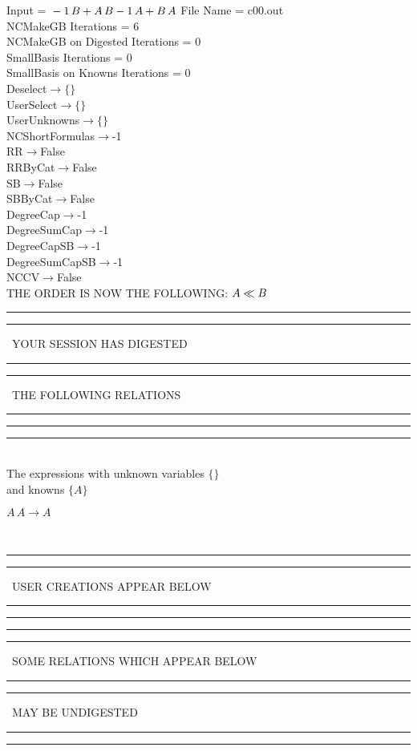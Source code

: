 \documentclass[rep10,leqno]{report}
\begin{document}
\normalsize
\baselineskip=12pt
\noindent
Input = 
$
\\-1\,
 B + A\,
 B\\
-1\,
 A + B\,
 A\\
$
File Name = c00.out\\
NCMakeGB Iterations = 6\\
NCMakeGB on Digested Iterations = 0\\
SmallBasis Iterations = 0\\
SmallBasis on Knowns Iterations = 0\\
Deselect$\rightarrow \{\}$\\
UserSelect$\rightarrow \{\}$\\
UserUnknowns$\rightarrow \{\}$\\
NCShortFormulas$\rightarrow$-1\\
RR$\rightarrow $False\\
RRByCat$\rightarrow $False\\
SB$\rightarrow $False\\
SBByCat$\rightarrow $False\\
DegreeCap$\rightarrow $-1\\
DegreeSumCap$\rightarrow $-1\\
DegreeCapSB$\rightarrow $-1\\
DegreeSumCapSB$\rightarrow $-1\\
NCCV$\rightarrow $False\\
THE ORDER IS NOW THE FOLLOWING:\hfil\break
$
A\ll
B\\
$
\rule[2pt]{6in}{4pt}\hfil\break
\rule[2pt]{1.879in}{4pt}
\ YOUR SESSION HAS DIGESTED\ 
\rule[2pt]{1.879in}{4pt}\hfil\break
\rule[2pt]{1.923in}{4pt}
\ THE FOLLOWING RELATIONS\ 
\rule[2pt]{1.923in}{4pt}\hfil\break
\rule[2pt]{6in}{4pt}\hfil\break
\rule[3pt]{6in}{.7pt}\\
The expressions with unknown variables $\{\}$\\
and knowns $\{A\}$\smallskip\\
\begin{minipage}{6in}
$
A\,
 A\rightarrow A
$
\end{minipage}\\
\rule[2pt]{6in}{1pt}\hfil\break
\rule[2.5pt]{1.701in}{1pt}
\ USER CREATIONS APPEAR BELOW\ 
\rule[2.5pt]{1.701in}{1pt}\hfil\break
\rule[2pt]{6in}{1pt}\hfil\break
\rule[2pt]{6in}{4pt}\hfil\break
\rule[2pt]{1.45in}{4pt}
\ SOME RELATIONS WHICH APPEAR BELOW\ 
\rule[2pt]{1.45in}{4pt}\hfil\break
\rule[2pt]{2.18in}{4pt}
\ MAY BE UNDIGESTED\ 
\rule[2pt]{2.18in}{4pt}\hfil\break
\rule[2pt]{6in}{4pt}\hfil\break
\end{document}
